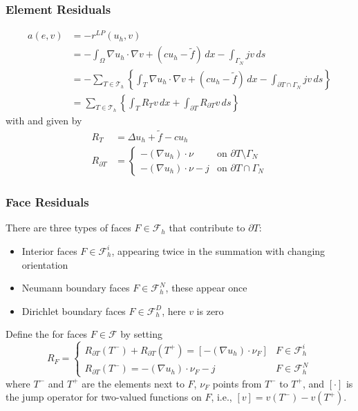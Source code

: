 \documentclass[aspectratio=169,11pt]{beamer}
\theoremstyle{definition}
\begin{document}
\begin{frame}
\frametitle{Element Residuals}
\begin{align*}
  a(e,v) &= - r^{LP}(u_h,v) \\
  &= - \int_\Omega \nabla u_h \cdot \nabla v + (c u_h - \tilde{f})\,dx - \int_{\Gamma_N} jv\,ds \\
  &= - \sum_{T \in \mathcal{T}_h} \left\{ \int_T \nabla u_h \cdot \nabla v + (c u_h - \tilde{f})\,dx - \int_{\partial T \cap \Gamma_N} jv\,ds \right\} \\
  &= \sum_{T \in \mathcal{T}_h} \left\{ \int_T R_T v \,dx + \int_{\partial T} R_{\partial T} v \,ds \right\}
\end{align*}
with  and  given by
\begin{align*}
  R_T &= \Delta u_h + \tilde{f} - c u_h \\
  R_{\partial T} &= \begin{cases} - (\nabla u_h) \cdot \nu & \text{on } \partial T \setminus \Gamma_N \\
    -(\nabla u_h) \cdot \nu - j & \text{on } \partial T \cap \Gamma_N \end{cases}
\end{align*}
\end{frame}

\begin{frame}
\frametitle{Face Residuals}
There are three types of faces $F \in \mathcal{F}_h$ that contribute to $\partial T$:
\begin{itemize}
  \item Interior faces $F \in \mathcal{F}_h^i$, appearing twice in the summation with changing orientation
  \item Neumann boundary faces $F \in \mathcal{F}_h^N$, these appear once
  \item Dirichlet boundary faces $F \in \mathcal{F}_h^D$, here $v$ is zero
\end{itemize}

\bigskip

  Define the  for faces $F \in \mathcal{F}$ by setting
\begin{equation*}
  R_F = \begin{cases} R_{\partial T}(T^-) + R_{\partial T}(T^+) = [- (\nabla u_h) \cdot \nu_F] & F \in \mathcal{F}_h^i \\
    R_{\partial T}(T^-) = - (\nabla u_h) \cdot \nu_F - j & F \in \mathcal{F}_h^N \end{cases}
\end{equation*}
where $T^-$ and $T^+$ are the elements next to $F$, $\nu_F$ points from $T^-$ to $T^+$, and $[\cdot]$ is the jump operator for two-valued functions on $F$, i.e., $[v] = v(T^-) - v(T^+)$.
\end{frame}
\end{document}
